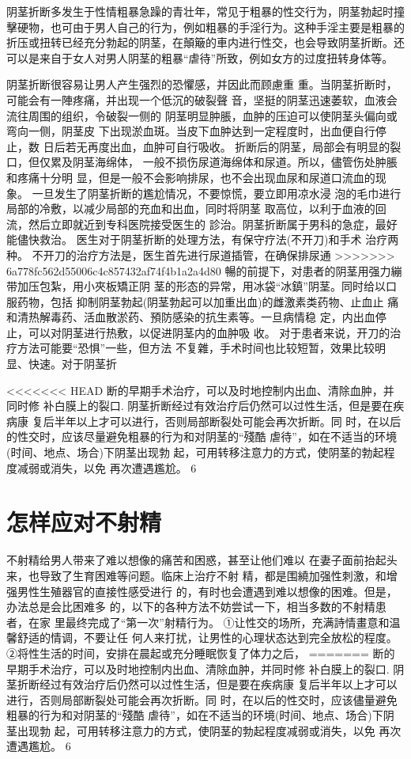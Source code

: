 \documentclass[12pt,UTF8]{ctexbook}
\begin{document}
阴茎折断多发生于性情粗暴急躁的青壮年，常见于粗暴的性交行为，阴茎勃起时撞擊硬物，也可由于男人自己的行为，例如粗暴的手淫行为。这种手淫主要是粗暴的折压或扭转已经充分勃起的阴茎，在顛簸的車内进行性交，也会导致阴茎折断。还可以是来自于女人对男人阴茎的粗暴“虐待”所致，例如女方的过度扭转身体等。

阴茎折断很容易让男人产生强烈的恐懼感，并因此而顾慮重
重。当阴茎折断时，可能会有一陣疼痛，并出现一个低沉的破裂聲
音，坚挺的阴茎迅速萎软，血液会流往周围的组织，令破裂一侧的
阴茎明显肿脹，血肿的压迫可以使阴茎头偏向或弯向一侧，阴茎皮
下出现淤血斑。当皮下血肿达到一定程度时，出血便自行停止，数
日后若无再度出血，血肿可自行吸收。
折断后的阴茎，局部会有明显的裂口，但仅累及阴茎海绵体，
一般不损伤尿道海绵体和尿道。所以，儘管伤处肿脹和疼痛十分明
显，但是一般不会影响排尿，也不会出现血尿和尿道口流血的现
象。
一旦发生了阴茎折断的尷尬情况，不要惊慌，要立即用凉水浸
泡的毛巾进行局部的冷敷，以减少局部的充血和出血，同时将阴茎
取高位，以利于血液的回流，然后立即就近到专科医院接受医生的
診治。阴茎折断属于男科的急症，最好能儘快救治。
医生对于阴茎折断的处理方法，有保守疗法(不开刀)和手术
治疗两种。
不开刀的治疗方法是，医生首先进行尿道插管，在确保排尿通
>>>>>>> 6a778fc562d55006c4c857432af74f4b1a2a4d80
暢的前提下，对患者的阴茎用强力繃带加压包紮，用小夾板矯正阴
茎的形态的异常，用冰袋“冰鎮”阴茎。同时给以口服药物，包括
抑制阴茎勃起(阴茎勃起可以加重出血)的雌激素类药物、止血止
痛和清热解毒药、活血散淤药、預防感染的抗生素等。一旦病情稳
定，内出血停止，可以对阴茎进行热敷，以促进阴茎内的血肿吸
收。
对于患者来说，开刀的治疗方法可能要“恐惧”一些，但方法
不复雜，手术时间也比较短暂，效果比较明显、快速。对于阴茎折

<<<<<<< HEAD
断的早期手术治疗，可以及时地控制内出血、清除血肿，并同时修
补白膜上的裂口.
阴茎折断经过有效治疗后仍然可以过性生活，但是要在疾病康
复后半年以上才可以进行，否则局部断裂处可能会再次折断。同
时，在以后的性交时，应该尽量避免粗暴的行为和对阴茎的“殘酷
虐待”，如在不适当的环境(时间、地点、场合)下阴茎出现勃
起，可用转移注意力的方式，使阴茎的勃起程度减弱或消失，以免
再次遭遇尷尬。
6
\section{怎样应对不射精}
不射精给男人带来了难以想像的痛苦和困惑，甚至让他们难以
在妻子面前抬起头来，也导致了生育困难等问题。临床上治疗不射
精，都是围繞加强性刺激，和增强男性生殖器官的直接性感受进行
的，有时也会遭遇到难以想像的困难。但是，办法总是会比困难多
的，以下的各种方法不妨尝试一下，相当多数的不射精患者，在家
里最终完成了“第一次”射精行为。
①让性交的场所，充满詩情畫意和温馨舒适的情调，不要让任
何人来打扰，让男性的心理状态达到完全放松的程度。
②将性生活的时间，安排在晨起或充分睡眠恢复了体力之后，
=======
断的早期手术治疗，可以及时地控制内出血、清除血肿，并同时修
补白膜上的裂口.
阴茎折断经过有效治疗后仍然可以过性生活，但是要在疾病康
复后半年以上才可以进行，否则局部断裂处可能会再次折断。同
时，在以后的性交时，应该儘量避免粗暴的行为和对阴茎的“殘酷
虐待”，如在不适当的环境(时间、地点、场合)下阴茎出现勃
起，可用转移注意力的方式，使阴茎的勃起程度减弱或消失，以免
再次遭遇尷尬。
6
\end{document}
